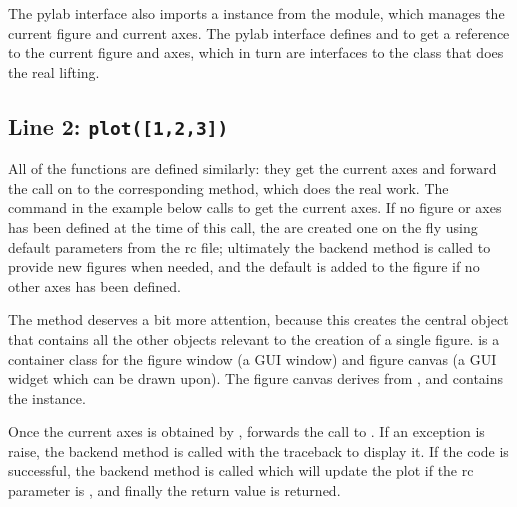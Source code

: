 \documentclass[twoside]{book}
\begin{document}
\noindent The pylab interface also imports a  instance from the
 module, which manages the
current figure and current axes.  The pylab interface defines
 and  to get a reference to the current figure and
axes, which in turn are interfaces to the  class that does
the real lifting.


\subsection*{Line 2: \texttt{plot([1,2,3])}}

All of the  functions are defined similarly:
they get the current axes and forward the call on to the corresponding
 method, which does the real work.  The
 command in the example below calls  to get the
current axes.  If no figure or axes has been defined at the time of
this call, the are created one on the fly using default parameters
from the rc file; ultimately the  backend
method is called to provide new figures when needed, and the default
 is added to the figure if no other axes has been
defined.  

The  method deserves a bit more attention,
because this creates the central object that contains all the other
objects relevant to the creation of a single figure.
 is a container
class for the figure window (a GUI window) and figure canvas (a GUI
widget which can be drawn upon).  The figure canvas derives from
, and contains the
 instance.

  

Once the current axes is obtained by ,  forwards
the call to .  If an exception is raise, the backend
 method is called with the traceback to display it.
If the code is successful, the backend 
method is called which will update the plot if the rc parameter
 is , and finally the return value is
returned.
\end{document}
